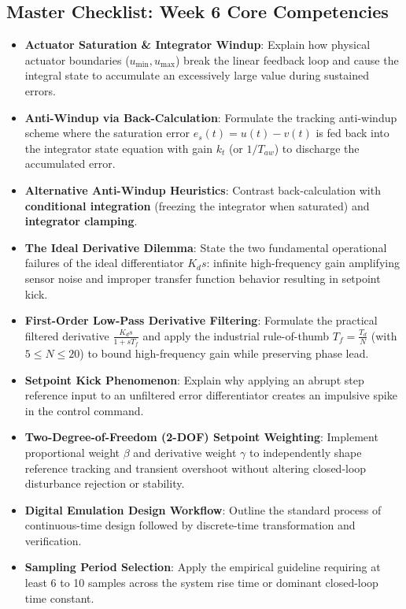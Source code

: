 \documentclass[12pt,onecolumn,twoside ]{article}
\begin{document}
	\subsection{Master Checklist: Week 6 Core Competencies}
	\begin{itemize}
		\item[$\square$]
		\textbf{Actuator Saturation \& Integrator Windup}: Explain how physical actuator boundaries ($u_{\min}, u_{\max}$) break the linear feedback loop and cause the integral state to accumulate an excessively large value during sustained errors.
		\item[$\square$]
		\textbf{Anti-Windup via Back-Calculation}: Formulate the tracking anti-windup scheme where the saturation error $e_s(t) = u(t) - v(t)$ is fed back into the integrator state equation with gain $k_t$ (or $1/T_{aw}$) to discharge the accumulated error.
		\item[$\square$]
		\textbf{Alternative Anti-Windup Heuristics}: Contrast back-calculation with \textbf{conditional integration} (freezing the integrator when saturated) and \textbf{integrator clamping}.
		\item[$\square$]
		\textbf{The Ideal Derivative Dilemma}: State the two fundamental operational failures of the ideal differentiator $K_d s$: infinite high-frequency gain amplifying sensor noise and improper transfer function behavior resulting in setpoint kick.
		\item[$\square$]
		\textbf{First-Order Low-Pass Derivative Filtering}: Formulate the practical filtered derivative $\frac{K_d s}{1 + sT_f}$ and apply the industrial rule-of-thumb $T_f = \frac{T_d}{N}$ (with $5 \le N \le 20$) to bound high-frequency gain while preserving phase lead.
		\item[$\square$]
		\textbf{Setpoint Kick Phenomenon}: Explain why applying an abrupt step reference input to an unfiltered error differentiator creates an impulsive spike in the control command.
		\item[$\square$]
		\textbf{Two-Degree-of-Freedom (2-DOF) Setpoint Weighting}: Implement proportional weight $\beta$ and derivative weight $\gamma$ to independently shape reference tracking and transient overshoot without altering closed-loop disturbance rejection or stability.
		\item[$\square$]
		\textbf{Digital Emulation Design Workflow}: Outline the standard process of continuous-time design followed by discrete-time transformation and verification.
		\item[$\square$]
		\textbf{Sampling Period Selection}: Apply the empirical guideline requiring at least 6 to 10 samples across the system rise time or dominant closed-loop time constant.

\end{itemize}
\end{document}
